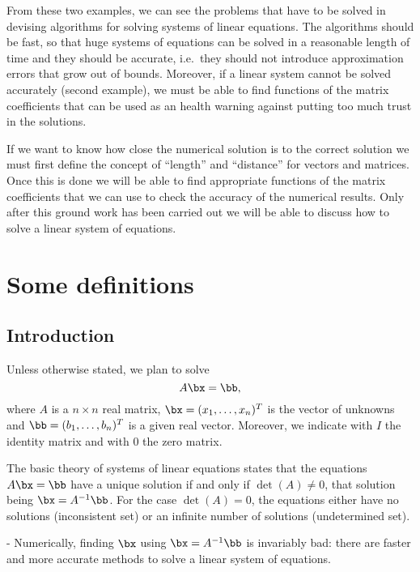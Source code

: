 From these two examples, we can see the problems that have to
be solved in   devising  algorithms  for  solving systems  of   linear
equations.  The algorithms  should be fast, so   that huge systems  of
equations can be solved in a reasonable length of time and they should
be accurate, i.e.\ they  should not introduce approximation errors that
grow out of  bounds.  Moreover, if a linear  system cannot be  solved
accurately (second example), we must be  able to find functions of the
matrix coefficients that  can  be used as   an health warning  against
putting too much trust in the solutions.

If we want to know how close the  numerical solution is to the correct
solution we  must    first define  the   concept  of  ``length''   and
``distance'' for vectors  and matrices.  Once this is  done we will be
able to find appropriate functions of  the matrix coefficients that we
can use to  check the accuracy of  the numerical results.   Only after
this ground work has been  carried out we will be  able to discuss how
to solve a linear system of equations.

\section{Some definitions}

\subsection{Introduction}

Unless otherwise stated, we plan to solve
%
\begin{equation*}
  A \bx = \bb ,
\end{equation*}
%
where $A$ is a $n \times n$ real  matrix, $\bx = (x_1, \ldots, x_n)^T$
is the vector of unknowns and $\bb = (b_1, \ldots,  b_n)^T$ is a given
real vector.  Moreover,  we indicate with $I$  the identity matrix and
with $0$ the zero matrix.

The basic theory of systems of linear equations states that the
equations $A \bx = \bb $ have a unique solution if and only if
$\det(A) \ne 0$, that solution being $\bx = A^{-1} \bb$.  For the case
$\det(A) = 0$, the equations either have no solutions (inconsistent
set) or an infinite number of solutions (undetermined set).

\smallskip

 - Numerically, finding $\bx$ using $\bx =
A^{-1} \bb$ is invariably bad: there are faster and more accurate
methods to solve a linear system of equations.

